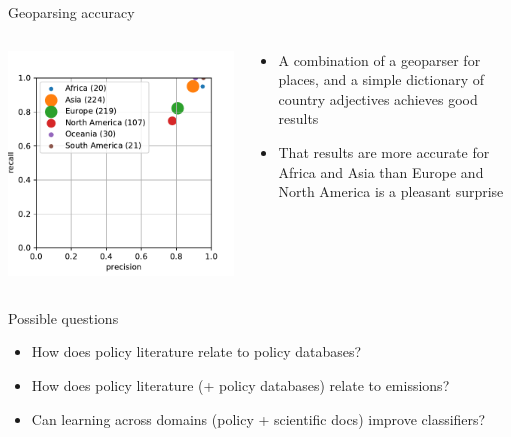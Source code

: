 \documentclass[9pt]{beamer}
\begin{document}
\begin{frame}{Geoparsing accuracy}

\begin{columns}
	\begin{column}{0.618\linewidth}
	\includegraphics[width=\linewidth]{../figures/place_accuracy.pdf}
	\end{column}
	\begin{column}{0.382\linewidth}
		\begin{itemize}
			\item A combination of a geoparser for places, and a simple dictionary of country adjectives achieves good results
			\item That results are more accurate for Africa and Asia than Europe and North America is a pleasant surprise
		\end{itemize}
	\end{column}
\end{columns}

\end{frame}

\begin{frame}{Possible questions}

\begin{itemize}
	\item How does policy literature relate to policy databases?
	\item How does policy literature (+ policy databases) relate to emissions?
	\item Can learning across domains (policy + scientific docs) improve classifiers?
\end{itemize}

\end{frame}
\end{document}
